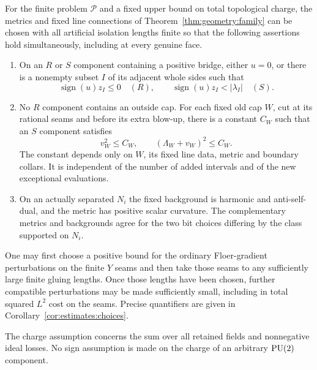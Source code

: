 \begin{theorem}
\label{thm:estimates:clamp}
For the finite problem $\mathcal P$ and a fixed upper bound on total
topological charge, the metrics and fixed line connections of
Theorem~\ref{thm:geometry:family} can be chosen with all artificial
isolation lengths finite so that the following assertions hold
simultaneously, including at every genuine face.
\begin{enumerate}[label=\textup{(\roman*)}]
\item On an $R$ or $S$ component containing a positive bridge, either
 $u=0$, or there is a nonempty subset $I$ of its adjacent whole sides
 such that
 \begin{equation}
   \operatorname{sign}(u)z_I\leq0\quad(R),
   \qquad
   \operatorname{sign}(u)z_I<|\lambda_I|\quad(S).
   \label{eq:estimates:clamp}
 \end{equation}
\item No $R$ component contains an outside cap.  For each fixed old
 cap $W$, cut at its rational seams and before its extra blow-up,
 there is a constant $C_W$ such that an $S$ component satisfies
 \begin{equation}
       v_W^2\leq C_W,\qquad (\Lambda_W+v_W)^2\leq C_W.
       \label{eq:estimates:cap-squares}
 \end{equation}
 The constant depends only on $W$, its fixed line data, metric and
 boundary collars.  It is independent of the number of added
 intervals and of the new exceptional evaluations.
\item On an actually separated $N_i$ the fixed background is harmonic
 and anti-self-dual, and the metric has positive scalar curvature.
 The complementary metrics and backgrounds agree for the two bit
 choices differing by the class supported on $N_i$.
\end{enumerate}
One may first choose a positive bound for the ordinary Floer-gradient
perturbations on the finite $Y$ seams and then take those seams to any
sufficiently large finite gluing lengths.  Once those lengths have
been chosen, further compatible perturbations may be made sufficiently
small, including in total squared $L^2$ cost on the seams.  Precise
quantifiers are given in Corollary~\ref{cor:estimates:choices}.

The charge assumption concerns the sum over all retained fields and
nonnegative ideal losses.  No sign assumption is made on the charge of
an arbitrary $\operatorname{PU}(2)$ component.
\end{theorem}

